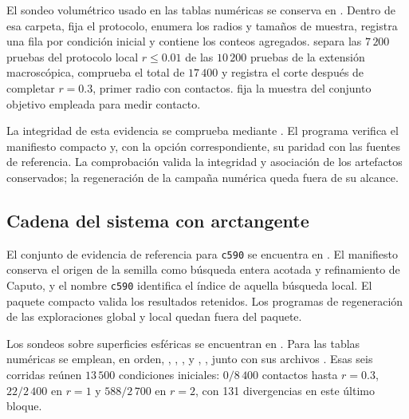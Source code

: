 El sondeo volumétrico usado en las tablas numéricas se conserva en
. Dentro de esa
carpeta,  fija el protocolo,
 enumera los radios y tamaños de muestra,
 registra una fila por condición inicial y
 contiene los conteos agregados.
 separa las \(7\,200\) pruebas del protocolo
local \(r\leq0.01\) de las \(10\,200\) pruebas de la extensión macroscópica,
comprueba el total de \(17\,400\) y registra el corte después de completar
\(r=0.3\), primer radio con contactos.
 fija la muestra del conjunto objetivo
empleada para medir contacto.

La integridad de esta evidencia se comprueba mediante
. El programa verifica el manifiesto compacto y, con
la opción correspondiente, su paridad con las fuentes de referencia. La
comprobación valida la integridad y asociación de los artefactos conservados;
la regeneración de la campaña numérica queda fuera de su alcance.

\subsection{Cadena del sistema con arctangente}

El conjunto de evidencia de referencia para \texttt{c590} se encuentra en
. El manifiesto
 conserva el origen de
la semilla como búsqueda entera acotada y refinamiento de Caputo, y el nombre
\texttt{c590} identifica el índice de aquella búsqueda local. El paquete
compacto valida los resultados retenidos. Los programas de regeneración de las
exploraciones global y local quedan fuera del paquete.

Los sondeos sobre superficies esféricas se encuentran en
. Para las tablas
numéricas se emplean, en orden,
,
,
,
 y
,
, junto con sus archivos
. Esas seis corridas reúnen \(13\,500\)
condiciones iniciales: \(0/8\,400\) contactos hasta \(r=0.3\),
\(22/2\,400\) en \(r=1\) y \(588/2\,700\) en \(r=2\), con 131
divergencias en este último bloque.

